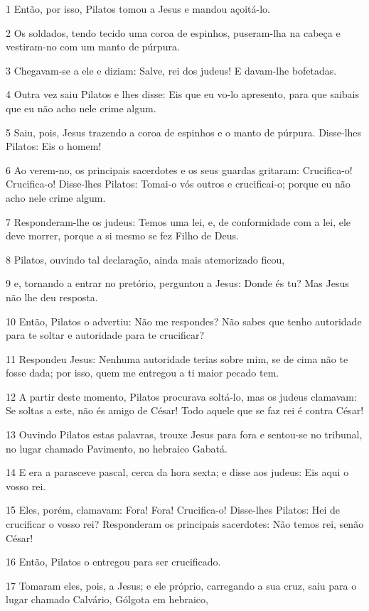 \par 1 Então, por isso, Pilatos tomou a Jesus e mandou açoitá-lo.
\par 2 Os soldados, tendo tecido uma coroa de espinhos, puseram-lha na cabeça e vestiram-no com um manto de púrpura.
\par 3 Chegavam-se a ele e diziam: Salve, rei dos judeus! E davam-lhe bofetadas.
\par 4 Outra vez saiu Pilatos e lhes disse: Eis que eu vo-lo apresento, para que saibais que eu não acho nele crime algum.
\par 5 Saiu, pois, Jesus trazendo a coroa de espinhos e o manto de púrpura. Disse-lhes Pilatos: Eis o homem!
\par 6 Ao verem-no, os principais sacerdotes e os seus guardas gritaram: Crucifica-o! Crucifica-o! Disse-lhes Pilatos: Tomai-o vós outros e crucificai-o; porque eu não acho nele crime algum.
\par 7 Responderam-lhe os judeus: Temos uma lei, e, de conformidade com a lei, ele deve morrer, porque a si mesmo se fez Filho de Deus.
\par 8 Pilatos, ouvindo tal declaração, ainda mais atemorizado ficou,
\par 9 e, tornando a entrar no pretório, perguntou a Jesus: Donde és tu? Mas Jesus não lhe deu resposta.
\par 10 Então, Pilatos o advertiu: Não me respondes? Não sabes que tenho autoridade para te soltar e autoridade para te crucificar?
\par 11 Respondeu Jesus: Nenhuma autoridade terias sobre mim, se de cima não te fosse dada; por isso, quem me entregou a ti maior pecado tem.
\par 12 A partir deste momento, Pilatos procurava soltá-lo, mas os judeus clamavam: Se soltas a este, não és amigo de César! Todo aquele que se faz rei é contra César!
\par 13 Ouvindo Pilatos estas palavras, trouxe Jesus para fora e sentou-se no tribunal, no lugar chamado Pavimento, no hebraico Gabatá.
\par 14 E era a parasceve pascal, cerca da hora sexta; e disse aos judeus: Eis aqui o vosso rei.
\par 15 Eles, porém, clamavam: Fora! Fora! Crucifica-o! Disse-lhes Pilatos: Hei de crucificar o vosso rei? Responderam os principais sacerdotes: Não temos rei, senão César!
\par 16 Então, Pilatos o entregou para ser crucificado.
\par 17 Tomaram eles, pois, a Jesus; e ele próprio, carregando a sua cruz, saiu para o lugar chamado Calvário, Gólgota em hebraico,
